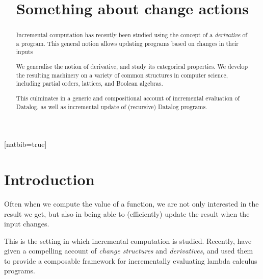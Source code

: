 
%


\usepackage{amsmath}
\usepackage{amsthm}
\usepackage{amssymb}
\usepackage{mathtools}
\usepackage{stmaryrd}
\usepackage{biblatex}[natbib=true]
\usepackage{hyperref}
\usepackage{cleveref}



\newif\ifproofs
\proofstrue





%


\begin{abstract}
  Incremental computation has recently been studied using the concept of a
  \textit{derivative} of a program. This general notion allows updating programs
  based on changes in their inputs

  We generalise the notion of derivative, and study its categorical
  properties. We develop the resulting machinery on a variety of common structures
  in computer science, including partial orders, lattices, and Boolean algebras.

  This culminates in a generic and compositional account of incremental evaluation of Datalog, as
  well as incremental update of (recursive) Datalog programs.
\end{abstract}

\title{Something about change actions}

\maketitle

\section{Introduction}

Often when we compute the value of a function, we are not only interested in the
result we get, but also in being able to (efficiently) update the result when
the input changes. 

This is the setting in which incremental computation is studied. Recently,
\textcite{cai2014changes} have given a compelling account
of \textit{change structures} and \textit{derivatives}, and used them to provide
a composable framework for incrementally evaluating lambda calculus programs.

